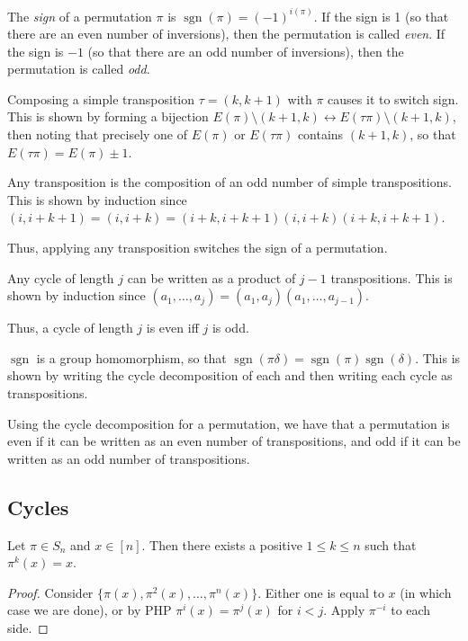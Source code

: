\documentclass[a4paper]{article}
\begin{document}
\begin{definition}
The \emph{sign} of a permutation $\pi$ is $\operatorname{sgn}(\pi)=(-1)^{i(\pi)}$. If the sign is 1 (so that there are an even number of inversions), then the permutation is called \emph{even}. If the sign is $-1$ (so that there are an odd number of inversions), then the permutation is called \emph{odd}.
\begin{arrows}
\item Composing a simple transposition $\tau=(k,k+1)$ with $\pi$ causes it to switch sign. This is shown by forming a bijection $E(\pi)\setminus(k+1,k)\leftrightarrow E(\tau\pi)\setminus(k+1,k)$, then noting that precisely one of $E(\pi)$ or $E(\tau\pi)$ contains $(k+1,k)$, so that $E(\tau\pi)=E(\pi)\pm1$.
\item Any transposition is the composition of an odd number of simple transpositions. This is shown by induction since $(i,i+k+1)=(i,i+k)=(i+k,i+k+1)(i,i+k)(i+k,i+k+1)$.
\item Thus, applying any transposition switches the sign of a permutation.
\item Any cycle of length $j$ can be written as a product of $j-1$ transpositions. This is shown by induction since $(a_1,\dots,a_j)=(a_1,a_j)(a_1,\dots,a_{j-1})$.
\item Thus, a cycle of length $j$ is even iff $j$ is odd.
\item $\operatorname{sgn}$ is a group homomorphism, so that $\operatorname{sgn}(\pi\delta)=\operatorname{sgn}(\pi)\operatorname{sgn}(\delta)$. This is shown by writing the cycle decomposition of each and then writing each cycle as transpositions.
\item Using the cycle decomposition for a permutation, we have that a permutation is even if it can be written as an even number of transpositions, and odd if it can be written as an odd number of transpositions.
\end{arrows}
\end{definition}

\subsection{Cycles}

\begin{lemma}\label{every_element_in_cycle}
Let $\pi\in S_n$ and $x\in[n]$. Then there exists a positive $1\leq k\leq n$ such that $\pi^k(x)=x$.

\begin{hl}
\begin{proof}
Consider $\{\pi(x),\pi^2(x),\dots,\pi^n(x)\}$. Either one is equal to $x$ (in which case we are done), or by PHP $\pi^i(x)=\pi^j(x)$ for $i<j$. Apply $\pi^{-i}$ to each side.
\end{proof}
\end{hl}
\end{lemma}
\end{document}
